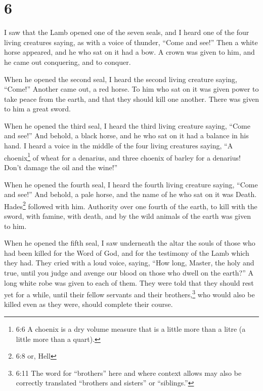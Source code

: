 \hypertarget{section-5}{%
\section{6}\label{section-5}}

 I saw that the Lamb opened one of the seven seals, and I
heard one of the four living creatures saying, as with a voice of
thunder, ``Come and see!''  Then a white horse appeared, and
he who sat on it had a bow. A crown was given to him, and he came out
conquering, and to conquer.

 When he opened the second seal, I heard the second living
creature saying, ``Come!''  Another came out, a red horse.
To him who sat on it was given power to take peace from the earth, and
that they should kill one another. There was given to him a great sword.

 When he opened the third seal, I heard the third living
creature saying, ``Come and see!'' And behold, a black horse, and he who
sat on it had a balance in his hand.  I heard a voice in the
middle of the four living creatures saying, ``A choenix\footnote{6:6 A
  choenix is a dry volume measure that is a little more than a litre (a
  little more than a quart).} of wheat for a denarius, and three choenix
of barley for a denarius! Don't damage the oil and the wine!''

 When he opened the fourth seal, I heard the fourth living
creature saying, ``Come and see!''  And behold, a pale
horse, and the name of he who sat on it was Death. Hades\footnote{6:8
  or, Hell} followed with him. Authority over one fourth of the earth,
to kill with the sword, with famine, with death, and by the wild animals
of the earth was given to him.

 When he opened the fifth seal, I saw underneath the altar
the souls of those who had been killed for the Word of God, and for the
testimony of the Lamb which they had.  They cried with a
loud voice, saying, ``How long, Master, the holy and true, until you
judge and avenge our blood on those who dwell on the earth?''
 A long white robe was given to each of them. They were
told that they should rest yet for a while, until their fellow servants
and their brothers,\footnote{6:11 The word for ``brothers'' here and
  where context allows may also be correctly translated ``brothers and
  sisters'' or ``siblings.''} who would also be killed even as they
were, should complete their course.


